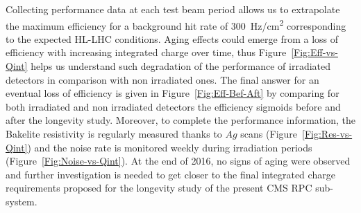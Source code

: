 	     Collecting performance data at each test beam period allows us to extrapolate the maximum efficiency for a background hit rate of \SI{300}{Hz/cm^2} corresponding to the expected HL-LHC conditions. Aging effects could emerge from a loss of efficiency with increasing integrated charge over time, thus Figure~\ref{Fig:Eff-vs-Qint} helps us understand such degradation of the performance of irradiated detectors in comparison with non irradiated ones. The final answer for an eventual loss of efficiency is given in Figure~\ref{Fig:Eff-Bef-Aft} by comparing for both irradiated and non irradiated detectors the efficiency sigmoids before and after the longevity study. Moreover, to complete the performance information, the Bakelite resistivity is regularly measured thanks to $Ag$ scans (Figure~\ref{Fig:Res-vs-Qint}) and the noise rate is monitored weekly during irradiation periods (Figure~\ref{Fig:Noise-vs-Qint}). At the end of 2016, no signs of aging were observed and further investigation is needed to get closer to the final integrated charge requirements proposed for the longevity study of the present CMS RPC sub-system.\\
	    

